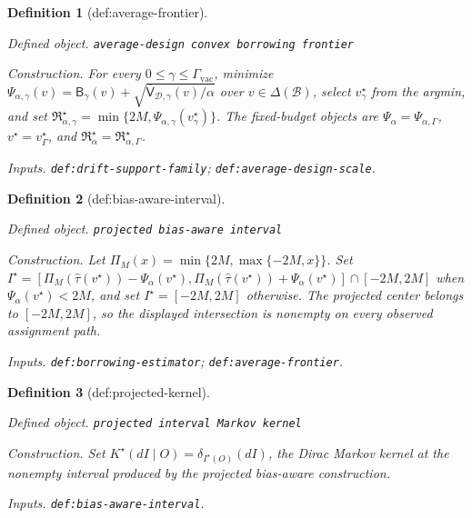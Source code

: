 \documentclass{article}
\newtheorem{definition}{Definition}
\begin{document}
\begin{definition}[def:average-frontier]\label{def:average-frontier}
\par\smallskip\noindent\emph{Defined object.} \texttt{average-\allowbreak{}design convex borrowing frontier}
\par\smallskip\noindent\emph{Construction.} For every \(0\le\gamma\le\Gamma_{\mathrm{vac}}\), minimize \(\Psi_{\alpha,\gamma}(v)=\mathsf B_\gamma(v)+\sqrt{\overline{\mathsf V}_{\mathcal D,\gamma}(v)/\alpha}\) over \(v\in\Delta(\mathcal B)\), select \(v_\gamma^\star\) from the argmin, and set \(\mathfrak R_{\alpha,\gamma}^\star=\min\{2M,\Psi_{\alpha,\gamma}(v_\gamma^\star)\}\). The fixed-budget objects are \(\Psi_\alpha=\Psi_{\alpha,\Gamma}\), \(v^\star=v_\Gamma^\star\), and \(\mathfrak R_\alpha^\star=\mathfrak R_{\alpha,\Gamma}^\star\).
\par\smallskip\noindent\emph{Inputs.} \texttt{def:\allowbreak{}drift-\allowbreak{}support-\allowbreak{}family}; \texttt{def:\allowbreak{}average-\allowbreak{}design-\allowbreak{}scale}.
\end{definition}

\begin{definition}[def:bias-aware-interval]\label{def:bias-aware-interval}
\par\smallskip\noindent\emph{Defined object.} \texttt{projected bias-\allowbreak{}aware interval}
\par\smallskip\noindent\emph{Construction.} Let \(\Pi_M(x)=\min\{2M,\max\{-2M,x\}\}\). Set \(I^\star=[\Pi_M(\widehat\tau(v^\star))-\Psi_\alpha(v^\star),\Pi_M(\widehat\tau(v^\star))+\Psi_\alpha(v^\star)]\cap[-2M,2M]\) when \(\Psi_\alpha(v^\star)<2M\), and set \(I^\star=[-2M,2M]\) otherwise. The projected center belongs to \([-2M,2M]\), so the displayed intersection is nonempty on every observed assignment path.
\par\smallskip\noindent\emph{Inputs.} \texttt{def:\allowbreak{}borrowing-\allowbreak{}estimator}; \texttt{def:\allowbreak{}average-\allowbreak{}frontier}.
\end{definition}

\begin{definition}[def:projected-kernel]\label{def:projected-kernel}
\par\smallskip\noindent\emph{Defined object.} \texttt{projected interval Markov kernel}
\par\smallskip\noindent\emph{Construction.} Set \(K^\star(dI\mid O)=\delta_{I^\star(O)}(dI)\), the Dirac Markov kernel at the nonempty interval produced by the projected bias-aware construction.
\par\smallskip\noindent\emph{Inputs.} \texttt{def:\allowbreak{}bias-\allowbreak{}aware-\allowbreak{}interval}.
\end{definition}
\end{document}
